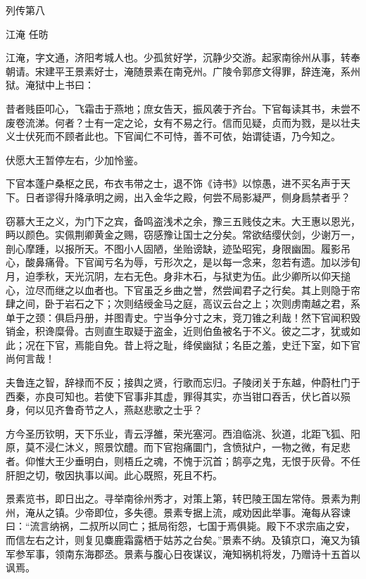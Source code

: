 \documentclass[12pt,UTF8]{ctexbook}
\begin{document}
列传第八

江淹 任昉

江淹，字文通，济阳考城人也。少孤贫好学，沉静少交游。起家南徐州从事，转奉朝请。宋建平王景素好士，淹随景素在南兗州。广陵令郭彦文得罪，辞连淹，系州狱。淹狱中上书曰：

昔者贱臣叩心，飞霜击于燕地；庶女告天，振风袭于齐台。下官每读其书，未尝不废卷流涕。何者？士有一定之论，女有不易之行。信而见疑，贞而为戮，是以壮夫义士伏死而不顾者此也。下官闻仁不可恃，善不可依，始谓徒语，乃今知之。

伏愿大王暂停左右，少加怜鉴。

下官本蓬户桑枢之民，布衣韦带之士，退不饰《诗书》以惊愚，进不买名声于天下。日者谬得升降承明之阙，出入金华之殿，何尝不局影凝严，侧身扃禁者乎？

窃慕大王之义，为门下之宾，备鸣盗浅术之余，豫三五贱伎之末。大王惠以恩光，眄以颜色。实佩荆卿黄金之赐，窃感豫让国士之分矣。常欲结缨伏剑，少谢万一，剖心摩踵，以报所天。不图小人固陋，坐贻谤缺，迹坠昭宪，身限幽圄。履影吊心，酸鼻痛骨。下官闻亏名为辱，亏形次之，是以每一念来，忽若有遗。加以涉旬月，迫季秋，天光沉阴，左右无色。身非木石，与狱吏为伍。此少卿所以仰天搥心，泣尽而继之以血者也。下官虽乏乡曲之誉，然尝闻君子之行矣。其上则隐于帘肆之间，卧于岩石之下；次则结绶金马之庭，高议云台之上；次则虏南越之君，系单于之颈：俱启丹册，并图青史。宁当争分寸之末，竞刀锥之利哉！然下官闻积毁销金，积谗糜骨。古则直生取疑于盗金，近则伯鱼被名于不义。彼之二才，犹或如此；况在下官，焉能自免。昔上将之耻，绛侯幽狱；名臣之羞，史迁下室，如下官尚何言哉！

夫鲁连之智，辞禄而不反；接舆之贤，行歌而忘归。子陵闭关于东越，仲蔚杜门于西秦，亦良可知也。若使下官事非其虚，罪得其实，亦当钳口吞舌，伏匕首以殒身，何以见齐鲁奇节之人，燕赵悲歌之士乎？

方今圣历钦明，天下乐业，青云浮雒，荣光塞河。西洎临洮、狄道，北距飞狐、阳原，莫不浸仁沐义，照景饮醴。而下官抱痛圜门，含愤狱户，一物之微，有足悲者。仰惟大王少垂明白，则梧丘之魂，不愧于沉首；鹄亭之鬼，无恨于灰骨。不任肝胆之切，敬因执事以闻。此心既照，死且不朽。

景素览书，即日出之。寻举南徐州秀才，对策上第，转巴陵王国左常侍。景素为荆州，淹从之镇。少帝即位，多失德。景素专据上流，咸劝因此举事。淹每从容谏曰：“流言纳祸，二叔所以同亡；抵局衔怨，七国于焉俱毙。殿下不求宗庙之安，而信左右之计，则复见麋鹿霜露栖于姑苏之台矣。”景素不纳。及镇京口，淹又为镇军参军事，领南东海郡丞。景素与腹心日夜谋议，淹知祸机将发，乃赠诗十五首以讽焉。
\end{document}
